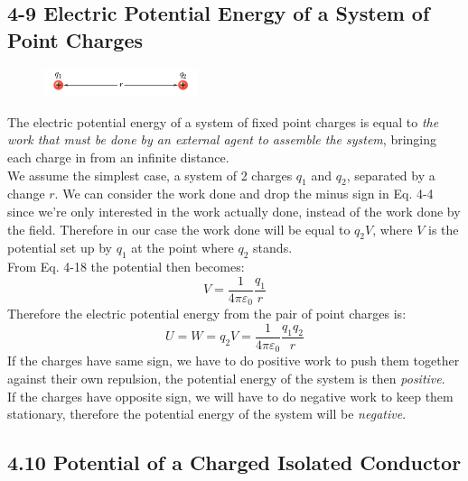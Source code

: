 \documentclass[12pt, a4paper]{article}
\begin{document}
		\subsection*{4-9 Electric Potential Energy of a System of Point Charges}

		\begin{figure}
			\centering
			\includegraphics[width=4.5cm]{Physics2_PNGs/2-charges-potential.png}
			\caption*{}
			\label{fig:2-charges-potential.png}
		\end{figure}
		The electric potential energy of a system of fixed point charges is equal to \textit{the work that must be done by an external agent to assemble the system}, bringing each charge in from an infinite distance. \\
		We assume the simplest case, a system of 2 charges $q_1$ and $q_2$, separated by a change $r$. We can consider the work done and drop the minus sign in Eq. 4-4 since we're only interested in the work actually done, instead of the work done by the field. Therefore in our case the work done will be equal to $q_2V$, where $V$ is the potential set up by $q_1$ at the point where $q_2$ stands. \\
		From Eq. 4-18 the potential then becomes:
		\[
			V = \frac{1}{4 \pi \varepsilon_0} \frac{q_1}{r}
		\]
		Therefore the electric potential energy from the pair of point charges is:
		\begin{equation*}
			U = W = q_2 V = \frac{1}{4 \pi \varepsilon_0} \frac{q_1 q_2}{r}
			\tag{4-33}
		\end{equation*}
		If the charges have same sign, we have to do positive work to push them together against their own repulsion, the potential energy of the system is then \textit{positive}. \\
		If the charges have opposite sign, we will have to do negative work to keep them stationary, therefore the potential energy of the system will be \textit{negative}.



		\subsection*{4.10 Potential of a Charged Isolated Conductor}
		
\end{document}
